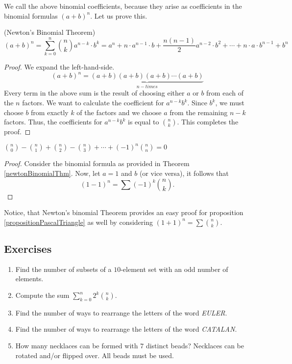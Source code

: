 We call the above binomial coefficients, because they arise as coefficients in the binomial formulas $(a+b)^n$. Let us prove this.

\begin{theorem}(Newton's Binomial Theorem)
$$
(a+b)^n = \sum_{k=0}^n {n \choose k} a^{n-k} \cdot b^k=a^n+n \cdot a^{n-1} \cdot b+ \frac{n(n-1)}{2} a^{n-2} \cdot b^2+ \cdots + n \cdot a \cdot b^{n-1}+b^n
$$
\label{newtonBinomialThm}
\end{theorem}

\begin{proof}
We expand the left-hand-side.
$$
(a+b)^n=\underbrace{(a+b)(a+b)(a+b)\cdots (a+b)}_{n-times}
$$
Every term in the above sum is the result of choosing either $a$ or $b$ from each of the $n$ factors. We want to calculate the coefficient for $a^{n-k}b^k$.
Since $b^k$, we must choose $b$ from exactly $k$ of the factors and we choose $a$ from the remaining $n-k$ factors.
Thus, the coefficients for $a^{n-k}b^k$ is equal to ${n \choose k}$. This completes the proof.
\end{proof}

\begin{corolarry}
$\displaystyle {n \choose 0}- {n \choose 1} + {n \choose 2} - {n \choose 3} + \cdots + (-1)^n {n \choose n}=0$
\end{corolarry}

\begin{proof}
Consider the binomial formula as provided in Theorem \ref{newtonBinomialThm}. Now, let $a=1$ and $b$ (or vice versa), it follows that 
$$
(1-1)^n= \sum (-1)^k {n \choose k}.
$$
\end{proof}

Notice, that Newton's binomial Theorem provides an easy proof for proposition \ref{propositionPascalTriangle} as well by considering $(1+1)^n=\sum {n \choose k}$.

\subsection{Exercises}

\begin{enumerate}
    \item Find the number of subsets of a $10$-element set with an odd number of elements.
    \item Compute the sum $\displaystyle \sum_{k=0}^n 2^k {n \choose k}$.
    \item Find the number of ways to rearrange the letters of the word \textit{EULER}.
    \item Find the number of ways to rearrange the letters of the word \textit{CATALAN}.
    \item How many necklaces can be formed with $7$ distinct beads? Necklaces can be rotated and/or flipped over. All beads must be used.
\end{enumerate}